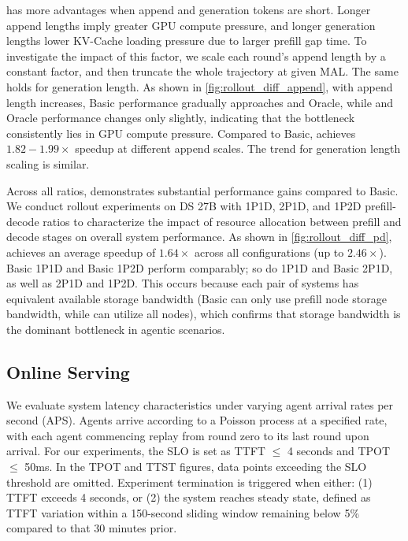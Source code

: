 \sysname has more advantages when append and generation tokens are short.
Longer append lengths imply greater GPU compute pressure, and longer generation lengths lower KV-Cache loading pressure due to larger prefill gap time.
To investigate the impact of this factor, we scale each round's append length by a constant factor, and then truncate the whole trajectory at given MAL.
The same holds for generation length.
As shown in \autoref{fig:rollout_diff_append}, with append length increases, Basic performance gradually approaches \sysname and Oracle, while \sysname and Oracle performance changes only slightly, indicating that the bottleneck consistently lies in GPU compute pressure.
Compared to Basic, \sysname achieves $1.82-1.99\times$ speedup at different append scales.
The trend for generation length scaling is similar.




Across all ratios, \sysname demonstrates substantial performance gains compared to Basic.
We conduct rollout experiments on DS 27B with 1P1D, 2P1D, and 1P2D prefill-decode ratios to characterize the impact of resource allocation between prefill and decode stages on overall system performance.
As shown in \autoref{fig:rollout_diff_pd}, \sysname achieves an average speedup of $1.64\times$ across all configurations (up to $2.46\times$).
Basic 1P1D and Basic 1P2D perform comparably; 
so do \sysname 1P1D and Basic 2P1D, 
as well as \sysname 2P1D and \sysname 1P2D.
This occurs because each pair of systems has equivalent available storage bandwidth (Basic can only use prefill node storage bandwidth, while \sysname can utilize all nodes), which confirms that storage bandwidth is the dominant bottleneck in agentic scenarios.



\subsection{Online Serving}
\label{subsec:online-serving}
 We evaluate system latency characteristics under varying agent arrival rates per second (APS).
Agents arrive according to a Poisson process at a specified rate, with each agent commencing replay from round zero to its last round upon arrival.
For our experiments, the SLO is set as TTFT $\leq$ 4 seconds and TPOT $\leq$ 50ms.
In the TPOT and TTST figures, data points exceeding the SLO threshold are omitted.
Experiment termination is triggered when either: (1) TTFT exceeds 4 seconds, or (2) the system reaches steady state, defined as TTFT variation within a 150-second sliding window remaining below 5\% compared to that 30 minutes prior. 



